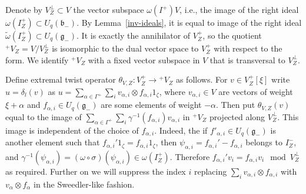 \documentclass[11pt]{article}
\numberwithin{equation}{section}
\begin{document}
 Denote by $V^\perp_Z\subset V$ the vector subspace $\omega(I^+)V$, i.e., the image of the right ideal $\omega(I^+_Z)\subset U_q(\mathfrak{b}_-)$. By Lemma~\ref{inv-ideals}, it is equal to image of the right ideal $\tilde \omega (I^+_Z)\subset U_q(\mathfrak{g}_-)$. It is exactly the annihilator of $V^+_Z$, so the quotient ${}^+\!V_Z=V/V^\perp_Z$ is isomorphic to the dual vector space to $V^+_Z$ with respect to the form. We identify ${}^+\!V_Z$ with a fixed vector subspace in $V$ that is transversal to $V^\perp_Z$.

Define extremal twist operator $\theta_{V,Z}\colon V^+_Z\to {}^+\!V_Z$ as follows. For $v\in V^+_Z[\xi]$ write $u=\delta_l(v)$ as $u=\sum_{\alpha\in \Gamma^+}\sum_i v_{\alpha,i}\otimes f_{\alpha,i} 1_\zeta$, where $v_{\alpha,i}\in V$ are vectors of weight $\xi+\alpha$ and $f_{\alpha,i}\in U_q(\mathfrak{g}_-)$ are some elements of weight $-\alpha$. Then put $\theta_{V,Z}(v)$ equal to the image of $\sum_{\alpha\in \Gamma^+}\sum_{i}\gamma^{-1}(f_{\alpha,i})v_{\alpha,i}$ in ${}^+\!V_Z$ projected along $V^\perp_Z$. This image is independent of the choice of $f_{\alpha,i}$. Indeed, the if $f'_{\alpha,i}\in U_q(\mathfrak{g}_-)$ is another element such that $f_{\alpha,i}'1_\zeta=f_{\alpha,i}1_\zeta$, then $\psi_{\alpha,i}=f_{\alpha,i}'-f_{\alpha,i}$ belongs to $I^-_Z$, and $\gamma^{-1}(\psi_{\alpha,i})=(\omega \circ \sigma) (\psi_{\alpha,i})\in \omega(I^+_Z)$. Therefore $f_{\alpha,i}'v_i=f_{\alpha,i}v_i \mod V^\perp_Z$ as required. Further on we will suppress the index $i$ replacing $\sum_iv_{\alpha,i}\otimes f_{\alpha,i}$ with $ v_{\alpha}\otimes f_{\alpha}$ in the Sweedler-like fashion.
\end{document}
